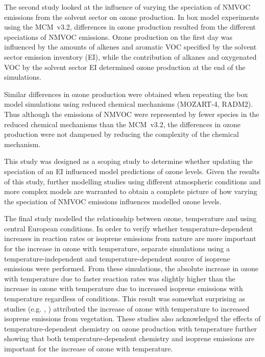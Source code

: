 The second study looked at the influence of varying the speciation of NMVOC emissions from the solvent sector on ozone production.
In box model experiments using the MCM~v3.2, differences in ozone production resulted from the different speciations of NMVOC emissions.
Ozone production on the first day was influenced by the amounts of alkenes and aromatic VOC specified by the solvent sector emission inventory (EI), while the contribution of alkanes and oxygenated VOC by the solvent sector EI determined ozone production at the end of the simulations.

Similar differences in ozone production were obtained when repeating the box model simulations using reduced chemical mechanisms (MOZART-4, RADM2).
Thus although the emissions of NMVOC were represented by fewer species in the reduced chemical mechanisms than the MCM~v3.2, the differences in ozone production were not dampened by reducing the complexity of the chemical mechanism.

This study was designed as a scoping study to determine whether updating the speciation of an EI influenced model predictions of ozone levels.
Given the results of this study, further modelling studies using different atmospheric conditions and more complex models are warranted to obtain a complete picture of how varying the speciation of NMVOC emissions influences modelled ozone levels.

The final study modelled the relationship between ozone, temperature and  using central European conditions.
In order to verify whether temperature-dependent increases in reaction rates or isoprene emissions from nature are more important for the increase in ozone with temperature, separate simulations using a temperature-independent and temperature-dependent source of isoprene emissions were performed.
From these simulations, the absolute increase in ozone with temperature due to faster reaction rates was slightly higher than the increase in ozone with temperature due to increased isoprene emissions with temperature regardless of  conditions.
This result was somewhat surprising as studies (e.g. \citet{Racherla:2008}, \citet{Doherty:2013}) attributed the increase of ozone with temperature to increased isoprene emissions from vegetation.
These studies also acknowledged the effects of temperature-dependent chemistry on ozone production with temperature further showing that both temperature-dependent chemistry and isoprene emissions are important for the increase of ozone with temperature.

